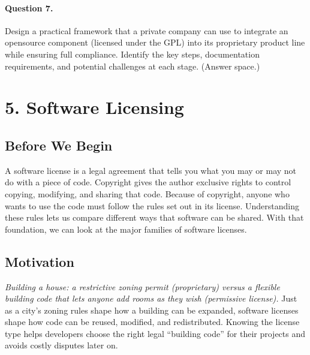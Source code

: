 \documentclass[12pt, a4paper]{article}
\begin{document}
\newpage
\paragraph{Question 7.}
Design a practical framework that a private company can use to integrate an opensource component (licensed under the GPL) into its proprietary product line while ensuring full compliance.  Identify the key steps, documentation requirements, and potential challenges at each stage.  
(Answer space.)

\newpage

\section{5. Software Licensing}

\subsection{Before We Begin}
A software license is a legal agreement that tells you what you may or may not do with a piece of code. Copyright gives the author exclusive rights to control copying, modifying, and sharing that code. Because of copyright, anyone who wants to use the code must follow the rules set out in its license. Understanding these rules lets us compare different ways that software can be shared. With that foundation, we can look at the major families of software licenses.

\subsection{Motivation}
\emph{Building a house: a restrictive zoning permit (proprietary) versus a flexible building code that lets anyone add rooms as they wish (permissive license).} Just as a city's zoning rules shape how a building can be expanded, software licenses shape how code can be reused, modified, and redistributed. Knowing the license type helps developers choose the right legal ``building code'' for their projects and avoids costly disputes later on.
\end{document}
